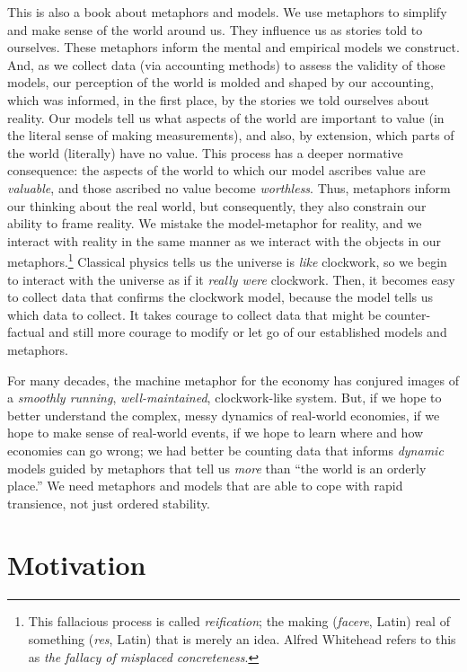 % 
% 
This is also a book about metaphors and models.
We use metaphors to simplify and make sense of the world around us.
They influence us as stories told to ourselves.
These metaphors inform the mental and empirical models we construct.
And, as we collect data (via accounting methods) 
to assess the validity of those models,
our perception of the world is molded and shaped
by our accounting, which was informed, in the first place,
by the stories we told ourselves about reality.
Our models tell us what aspects of the world
are important to value 
(in the literal sense of making measurements),
 and also, by extension, 
 which parts of the world (literally) have no value.
This process has a deeper normative
consequence: the aspects of the world to which our model ascribes
value are \emph{valuable},
and those ascribed no value become \emph{worthless}.
Thus, metaphors inform our thinking about the real world,
but consequently,
they also constrain our ability to frame reality.
We mistake the model-metaphor for reality, and
we interact with reality in the same manner 
as we interact with the objects in our
metaphors.\footnote{This fallacious process is called
	\emph{reification}; the making (\emph{facere}, Latin) real of
	something (\emph{res}, Latin) that is merely an idea.
	Alfred Whitehead refers to this as
	\emph{the fallacy of misplaced concreteness}.\cite{Whitehead2011}}
Classical physics tells us the universe is
\emph{like} clockwork, 
so we begin to interact with the universe
as if it \emph{really were} clockwork.
Then, it becomes easy to collect data that confirms the clockwork model,
because the model tells us which data to collect.
It takes courage to collect data that might be counter-factual
and still more courage to modify 
or let go of our established models and metaphors.

For many decades, the machine metaphor for the economy
has conjured images of a \emph{smoothly running}, 
\emph{well-maintained}, clockwork-like system.
But, if we hope to better understand the complex, 
messy dynamics of real-world economies,
if we hope to make sense of real-world events, 
if we hope to learn where and how economies can go wrong;
we had better be counting data that informs \emph{dynamic} models
guided by metaphors that tell us \emph{more} than ``the world is an orderly place.''
We need metaphors and models that are
able to cope with rapid transience,
not just ordered stability.


\section{Motivation}
\label{sec:motivation}

